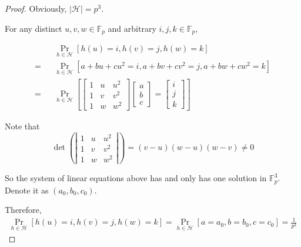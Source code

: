 			\begin{proof}
				Obviously, $|\mathcal{H}| = p^3$.
				
				For any distinct $u, v, w \in \mathbb{F}_{p}$ and arbitrary $i, j, k \in \mathbb{F}_{p}$,
				
				\begin{eqnarray*}
					&&\mathop{\text{Pr}} \limits_{h \in \mathcal{H}} [h(u) = i, h(v) = j, h(w) = k] \\
					= &&\mathop{\text{Pr}} \limits_{h \in \mathcal{H}} [a + bu + cu^2 = i, a + bv + cv^2 = j, a + bw + cw^2 = k] \\
					= &&\mathop{\text{Pr}} \limits_{h \in \mathcal{H}}[
					\left[
					\begin{matrix}
						1 & u & u^2 \\
						1 & v & v^2 \\
						1 & w & w^2
					\end{matrix}
					\right]
					\left[
					\begin{matrix}
						a \\
						b \\
						c
					\end{matrix}
					\right]
					=
					\left[
					\begin{matrix}
						i \\
						j \\
						k
					\end{matrix}
					\right]
					]
				\end{eqnarray*}
				
				Note that
				\[
					\det
					\left(\left|
					\begin{matrix}
						1 & u & u^2 \\
						1 & v & v^2 \\
						1 & w & w^2
					\end{matrix}
					\right|\right)
					=
					(v - u)(w - u)(w - v)
					\neq
					0
				\]
				
				So the system of linear equations above has and only has one solution in $\mathbb{F}^{3}_{p}$.
				Denote it as $(a_0, b_0, c_0)$.
				
				Therefore,
				\begin{eqnarray*}
					\mathop{\text{Pr}} \limits_{h \in \mathcal{H}}[h(u) = i, h(v) = j, h(w) = k]
					= \mathop{\text{Pr}} \limits_{h \in \mathcal{H}}[a = a_0, b = b_0, c = c_0]
					= \frac{1}{p^3}
				\end{eqnarray*}
			\end{proof}